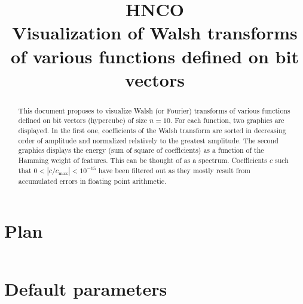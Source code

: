 \documentclass[a4paper]{article}
\begin{document}

\title{HNCO\\
  Visualization of Walsh transforms\\
  of various functions defined on bit vectors}
\maketitle

\begin{abstract}
  This document proposes to visualize Walsh (or Fourier) transforms of
  various functions defined on bit vectors (hypercube) of size
  $n=10$. For each function, two graphics are displayed. In the first
  one, coefficients of the Walsh transform are sorted in decreasing
  order of amplitude and normalized relatively to the greatest
  amplitude. The second graphics displays the energy (sum of square of
  coefficients) as a function of the Hamming weight of features. This
  can be thought of as a spectrum. Coefficients $c$ such that
  $0 < |c/c_{\max}| < 10^{-15}$ have been filtered out as they mostly
  result from accumulated errors in floating point arithmetic.
\end{abstract}

\tableofcontents



\appendix

\section{Plan}

\inputminted[breaklines=true]{json}{../plan-compact.json}

\section{Default parameters}

\inputminted[breaklines=true]{text}{../log.defaults}
\end{document}
